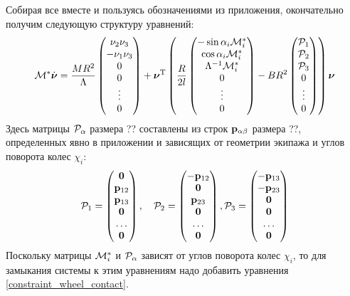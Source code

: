 Собирая все вместе и пользуясь обозначениями из приложения, окончательно получим следующую структуру уравнений:
\begin{eqnarray}\label{eq:full_system}
\mathcal{M}^*\dot{\boldsymbol{\mathbf{\nu}}} = 
\frac{MR^2}{\Lambda}\left(\begin{matrix}
    \nu_2\nu_3\\
    -\nu_1\nu_3\\
    0\\
    0\\
    \vdots
    \\
    0
\end{matrix}\right)
+\boldsymbol{\mathbf{\nu}}^\mathrm{T}\left(
\frac{R}{2l}
\left(\begin{matrix}
    -\sin\alpha_i \mathcal{M}^*_i\\
    \cos\alpha_i \mathcal{M}^*_i\\
    \Lambda^{-1}\mathcal{M}^*_i\\
    0\\
    \vdots
    \\
    0
    \end{matrix}
\right)
-BR^2
\left(\begin{matrix}
    \mathcal{P}_1\\
    \mathcal{P}_2\\
    \mathcal{P}_3\\
    0\\
    \vdots
    \\
    0
\end{matrix}\right)
\right)
\boldsymbol{\mathbf{\nu}}
\end{eqnarray}
Здесь матрицы $\mathcal{P}_\alpha$ размера ?? составлены из строк $\mathbf{p}_{\alpha\beta}$ размера ??, определенных явно в приложении и зависящих от геометрии экипажа и углов поворота колес $\chi_i$:
$$ 
\mathcal{P}_1 = \left(
\begin{matrix}
 \boldsymbol{\mathbf{0}} \\
 \mathbf{p}_{12}\\
\mathbf{p}_{13}\\
\boldsymbol{\mathbf{0}}\\
\dots\\
\boldsymbol{\mathbf{0}}
\end{matrix}
\right),\quad
\mathcal{P}_2 = \left(
\begin{matrix}
-\mathbf{p}_{12}\\
\boldsymbol{\mathbf{0}}\\
\mathbf{p}_{23}\\
\boldsymbol{\mathbf{0}}\\
\dots\\
\boldsymbol{\mathbf{0}}
\end{matrix}
\right),
\mathcal{P}_3 = \left(
\begin{matrix}
-\mathbf{p}_{13}\\
-\mathbf{p}_{23}\\
\boldsymbol{\mathbf{0}}\\
\boldsymbol{\mathbf{0}}\\
\dots\\
\boldsymbol{\mathbf{0}}
\end{matrix}
\right)
$$
Поскольку матрицы $\mathcal{M}^*_i$ и $\mathcal{P}_\alpha$ зависят от углов поворота колес $\chi_i$, то для замыкания системы к этим уравнениям надо добавить уравнения
\ref{constraint_wheel_contact}.

